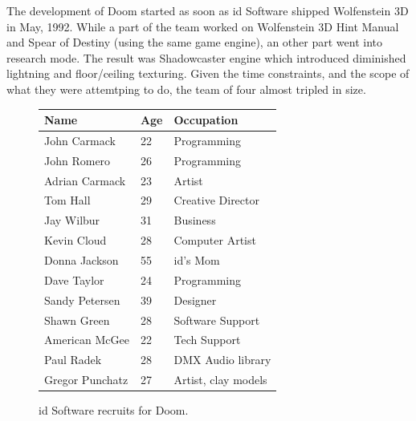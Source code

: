 The development of Doom started as soon as id Software shipped Wolfenstein 3D in May, 1992. While a part of the team worked on Wolfenstein 3D Hint Manual and Spear of Destiny (using the same game engine), an other part went into research mode. The result was Shadowcaster engine which introduced diminished lightning and floor/ceiling texturing. Given the time constraints, and the scope of what they were attemtping to do, the team of four almost tripled in size.\\
\par
 \begin{figure}[H]
\centering  
\begin{tabularx}{\textwidth}{ X  X  X  }
  \toprule
  \textbf{Name} &  \textbf{Age} & \textbf{Occupation} \\
  \toprule 
   John Carmack & 22 &  Programming\\
   John Romero & 26 &  Programming\\
   Adrian Carmack & 23 &  Artist\\
   Tom Hall\protect\footnotemark  & 29 &  Creative Director\\
   Jay Wilbur & 31 &  Business\\
   Kevin Cloud& 28 &  Computer Artist\\
   Donna Jackson & 55 & id's Mom\\   
   Dave Taylor & 24 & Programming\\
   Sandy Petersen & 39 & Designer\\
   Shawn Green & 28 & Software Support\\
   American McGee & 22 & Tech Support\\
   Paul Radek & 28 & DMX Audio library\\
   Gregor Punchatz & 27 & Artist, clay models\\

     \toprule
\end{tabularx}
\caption{id Software recruits for Doom.}\label{fig:Id Software team}
\end{figure}
\\
\par

